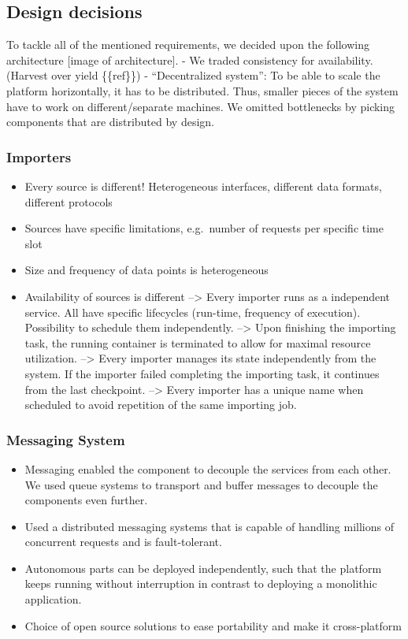 \subsection{Design decisions}\label{design-decisions}

To tackle all of the mentioned requirements, we decided upon the
following architecture {[}image of architecture{]}. - We traded
consistency for availability. (Harvest over yield \{\{ref\}\}) -
``Decentralized system'': To be able to scale the platform horizontally,
it has to be distributed. Thus, smaller pieces of the system have to
work on different/separate machines. We omitted bottlenecks by picking
components that are distributed by design.

\subsubsection{Importers}\label{importers}

\begin{itemize}
\tightlist
\item
  Every source is different! Heterogeneous interfaces, different data
  formats, different protocols
\item
  Sources have specific limitations, e.g.~number of requests per
  specific time slot
\item
  Size and frequency of data points is heterogeneous
\item
  Availability of sources is different --\textgreater{} Every importer
  runs as a independent service. All have specific lifecycles (run-time,
  frequency of execution). Possibility to schedule them independently.
  --\textgreater{} Upon finishing the importing task, the running
  container is terminated to allow for maximal resource utilization.
  --\textgreater{} Every importer manages its state independently from
  the system. If the importer failed completing the importing task, it
  continues from the last checkpoint. --\textgreater{} Every importer
  has a unique name when scheduled to avoid repetition of the same
  importing job.
\end{itemize}

\subsubsection{Messaging System}\label{messaging-system}

\begin{itemize}
\tightlist
\item
  Messaging enabled the component to decouple the services from each
  other. We used queue systems to transport and buffer messages to
  decouple the components even further.
\item
  Used a distributed messaging systems that is capable of handling
  millions of concurrent requests and is fault-tolerant.
\item
  Autonomous parts can be deployed independently, such that the platform
  keeps running without interruption in contrast to deploying a
  monolithic application.
\item
  Choice of open source solutions to ease portability and make it
  cross-platform
\end{itemize}

